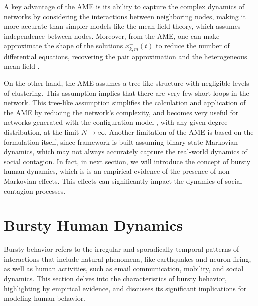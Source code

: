 A key advantage of the AME is its ability to capture the complex dynamics of networks by considering the interactions between neighboring nodes, making it more accurate than simpler models like the mean-field theory, which assumes independence between nodes. Moreover, from the AME, one can make approximate the shape of the solutions $x^{\pm}_{k,m} (t)$ to reduce the number of differential equations, recovering the pair approximation and the heterogeneous mean field \cite{gleeson-2011,gleeson-2013}.

On the other hand, the AME assumes a tree-like structure with negligible levels of clustering. This assumption implies that there are very few short loops in the network. This tree-like assumption simplifies the calculation and application of the AME by reducing the network's complexity, and becomes very useful for networks generated with the configuration model \cite{newman-book}, with any given degree distribution, at the limit $N \to \infty$. Another limitation of the AME is based on the formulation itself, since framework is built assuming binary-state Markovian dynamics, which may not always accurately capture the real-world dynamics of social contagion. In fact, in next section, we will introduce the concept of bursty human dynamics, which is is an empirical evidence of the presence of non-Markovian effects. This effects can significantly impact the dynamics of social contagion processes.

\section{\label{sec: Bursty Human Dynamics} Bursty Human Dynamics}

Bursty behavior refers to the irregular and sporadically temporal patterns of interactions that include natural phenomena, like earthquakes and neuron firing, as well as human activities, such as email communication, mobility, and social dynamics. This section delves into the characteristics of bursty behavior, highlighting by empirical evidence, and discusses its significant implications for modeling human behavior.

